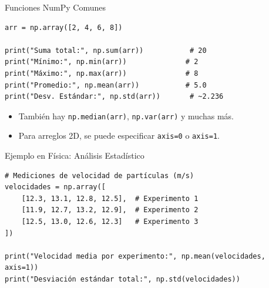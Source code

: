 \documentclass[10pt]{beamer}
\begin{document}
\begin{frame}[fragile]{Funciones NumPy Comunes}
\begin{verbatim}
arr = np.array([2, 4, 6, 8])

print("Suma total:", np.sum(arr))           # 20
print("Mínimo:", np.min(arr))              # 2
print("Máximo:", np.max(arr))              # 8
print("Promedio:", np.mean(arr))           # 5.0
print("Desv. Estándar:", np.std(arr))       # ~2.236
\end{verbatim}
\begin{itemize}
  \item También hay \texttt{np.median(arr)}, \texttt{np.var(arr)} y muchas más.
  \item Para arreglos 2D, se puede especificar \texttt{axis=0} o \texttt{axis=1}.
\end{itemize}

\begin{block}{Ejemplo en Física: Análisis Estadístico}
\begin{verbatim}
# Mediciones de velocidad de partículas (m/s)
velocidades = np.array([
    [12.3, 13.1, 12.8, 12.5],  # Experimento 1
    [11.9, 12.7, 13.2, 12.9],  # Experimento 2
    [12.5, 13.0, 12.6, 12.3]   # Experimento 3
])

print("Velocidad media por experimento:", np.mean(velocidades, axis=1))
print("Desviación estándar total:", np.std(velocidades))
\end{verbatim}
\end{block}
\end{frame}
\end{document}

